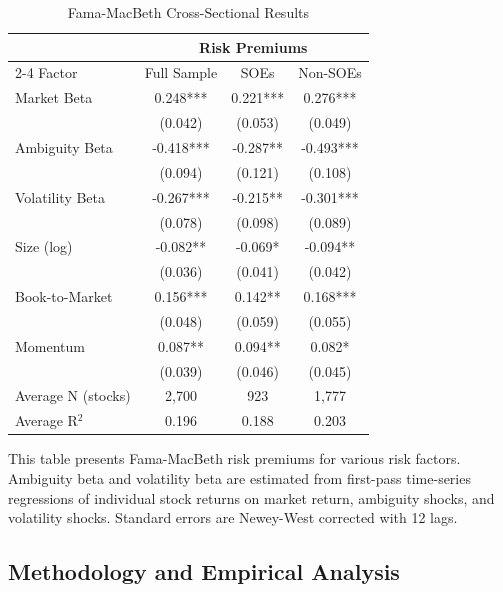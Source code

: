 \documentclass[preprint,12pt,authoryear]{elsarticle}
\begin{document}
\begin{table}[htbp]
\centering
\caption{Fama-MacBeth Cross-Sectional Results}
\label{tab:fama_macbeth}
\begin{threeparttable}
\begin{tabular*}{\textwidth}{@{\extracolsep{\fill}} lccc @{\extracolsep{\fill}}}
\toprule
& \multicolumn{3}{c}{Risk Premiums} \\
\cmidrule(lr){2-4}
Factor & Full Sample & SOEs & Non-SOEs \\
\midrule
\midrule
Market Beta & 0.248*** & 0.221*** & 0.276*** \\
& (0.042) & (0.053) & (0.049) \\
Ambiguity Beta & -0.418*** & -0.287** & -0.493*** \\
& (0.094) & (0.121) & (0.108) \\
Volatility Beta & -0.267*** & -0.215** & -0.301*** \\
& (0.078) & (0.098) & (0.089) \\
Size (log) & -0.082** & -0.069* & -0.094** \\
& (0.036) & (0.041) & (0.042) \\
Book-to-Market & 0.156*** & 0.142** & 0.168*** \\
& (0.048) & (0.059) & (0.055) \\
Momentum & 0.087** & 0.094** & 0.082* \\
& (0.039) & (0.046) & (0.045) \\
\midrule
Average N (stocks) & 2,700 & 923 & 1,777 \\
Average R$^2$ & 0.196 & 0.188 & 0.203 \\
\bottomrule
\end{tabular*}
\begin{tablenotes}[flushleft]
\small
\item[] This table presents Fama-MacBeth risk premiums for various risk factors. Ambiguity beta and volatility beta are estimated from first-pass time-series regressions of individual stock returns on market return, ambiguity shocks, and volatility shocks. Standard errors are Newey-West corrected with 12 lags.
\end{tablenotes}
\end{threeparttable}
\end{table}

\subsection{Methodology and Empirical Analysis}
\end{document}
